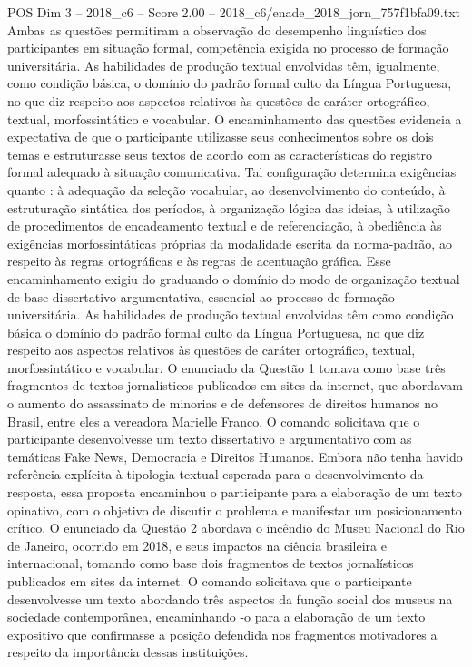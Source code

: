 \begin{textsample}{POS Dim 3 – 2018\_c6 – Score 2.00 – 2018\_c6/enade\_2018\_jorn\_757f1bfa09.txt}
Ambas as questões permitiram a observação do desempenho linguístico dos participantes em situação formal, competência exigida no processo de formação universitária.
As habilidades de produção textual envolvidas têm, igualmente, como condição básica, o domínio do padrão formal culto da Língua Portuguesa, no que diz respeito aos aspectos relativos às questões de caráter ortográfico, textual, morfossintático e vocabular.
O encaminhamento das questões evidencia a expectativa de que o participante utilizasse seus conhecimentos sobre os dois temas e estruturasse seus textos de acordo com as características do registro formal adequado à situação comunicativa.
Tal configuração determina exigências quanto : à adequação da seleção vocabular, ao desenvolvimento do conteúdo, à estruturação sintática dos períodos, à organização lógica das ideias, à utilização de procedimentos de encadeamento textual e de referenciação, à obediência às exigências morfossintáticas próprias da modalidade escrita da norma-padrão, ao respeito às regras ortográficas e às regras de acentuação gráfica.
Esse encaminhamento exigiu do graduando o domínio do modo de organização textual de base dissertativo-argumentativa, essencial ao processo de formação universitária.
As habilidades de produção textual envolvidas têm como condição básica o domínio do padrão formal culto da Língua Portuguesa, no que diz respeito aos aspectos relativos às questões de caráter ortográfico, textual, morfossintático e vocabular.
O enunciado da Questão 1 tomava como base três fragmentos de textos jornalísticos publicados em sites da internet, que abordavam o aumento do assassinato de minorias e de defensores de direitos humanos no Brasil, entre eles a vereadora Marielle Franco.
O comando solicitava que o participante desenvolvesse um texto dissertativo e argumentativo com as temáticas Fake News, Democracia e Direitos Humanos.
Embora não tenha havido referência explícita à tipologia textual esperada para o desenvolvimento da resposta, essa proposta encaminhou o participante para a elaboração de um texto opinativo, com o objetivo de discutir o problema e manifestar um posicionamento crítico.
O enunciado da Questão 2 abordava o incêndio do Museu Nacional do Rio de Janeiro, ocorrido em 2018, e seus impactos na ciência brasileira e internacional, tomando como base dois fragmentos de textos jornalísticos publicados em sites da internet.
O comando solicitava que o participante desenvolvesse um texto abordando três aspectos da função social dos museus na sociedade contemporânea, encaminhando -o para a elaboração de um texto expositivo que confirmasse a posição defendida nos fragmentos motivadores a respeito da importância dessas instituições.

\end{textsample}
